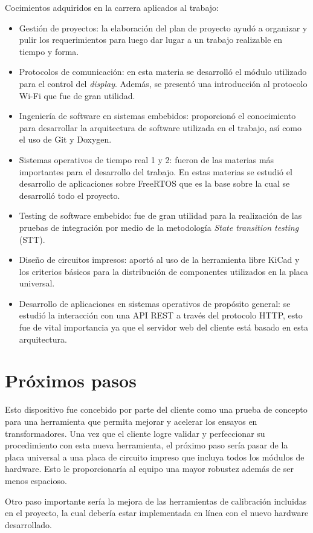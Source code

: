 Cocimientos adquiridos en la carrera aplicados al trabajo:
\begin{itemize}
\item Gestión de proyectos: la elaboración del plan de proyecto ayudó a organizar y pulir los requerimientos para luego dar lugar a un trabajo realizable en tiempo y forma.
\item Protocolos de comunicación: en esta materia se desarrolló el módulo utilizado para el control del \textit{display}. Además, se presentó una introducción al protocolo Wi-Fi que fue de gran utilidad.
\item Ingeniería de software en sistemas embebidos: proporcionó el conocimiento para desarrollar la arquitectura de software utilizada en el trabajo, así como el uso de Git y Doxygen.
\item Sistemas operativos de tiempo real 1 y 2: fueron de las materias más importantes para el desarrollo del trabajo. En estas materias se estudió el desarrollo de aplicaciones sobre FreeRTOS que es la base sobre la cual se desarrolló todo el proyecto.
\item Testing de software embebido: fue de gran utilidad para la realización de las pruebas de integración por medio de la metodología \textit{State transition testing} (STT).
\item Diseño de circuitos impresos: aportó al uso de la herramienta libre KiCad y los criterios básicos para la distribución de componentes utilizados en la placa universal.
\item Desarrollo de aplicaciones en sistemas operativos de propósito general: se estudió la interacción con una API REST a través del protocolo HTTP, esto fue de vital importancia ya que el servidor web del cliente está basado en esta arquitectura.
\end{itemize}

\section{Próximos pasos}

Esto dispositivo fue concebido por parte del cliente como una prueba de concepto para una herramienta que permita mejorar y acelerar los ensayos en transformadores. Una vez que el cliente logre validar y perfeccionar su procedimiento con esta nueva herramienta, el próximo paso sería pasar de la placa universal a una placa de circuito impreso que incluya todos los módulos de hardware. Esto le proporcionaría al equipo una mayor robustez además de ser menos espacioso.

Otro paso importante sería la mejora de las herramientas de calibración incluidas en el proyecto, la cual debería estar implementada en línea con el nuevo hardware desarrollado.